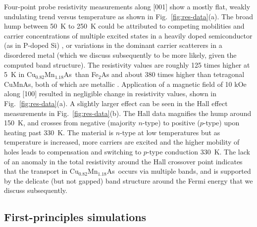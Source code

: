 \documentclass[letterpaper,10pt,doublespacing,edeposit]{uiucthesis2020}
\newcommand*{\cumnas}{Cu$_{0.82}$Mn$_{1.18}$As}
\begin{document}
\begin{mainmatter}
Four-point probe resistivity measurements along [001] show a mostly flat, weakly undulating trend versus temperature as shown in Fig.\ \ref{fig:res-data}(a).
The broad hump between 50~K to 250~K could be attributed to competing mobilities and carrier concentrations of multiple excited states in a heavily doped semiconductor (as in P-doped Si) \cite{Chapman1963}, or variations in the dominant carrier scatterers in a disordered metal (which we discuss subsequently to be more likely, given the computed band structure).
The resistivity values are roughly 125 times higher at 5~K in \cumnas\ than Fe$_2$As and about 380 times higher than tetragonal CuMnAs, both of which are metallic \cite{Takeshita2017,Wadley2013}.
Application of a magnetic field of 10 kOe along [100]  resulted in negligible change in resistivity values, shown in Fig.\ \ref{fig:res-data}(a).
A slightly larger effect can be seen in the Hall effect measurements in Fig.\ \ref{fig:res-data}(b).
The Hall data magnifies the hump around 150~K, and crosses from negative (majority $n$-type) to positive ($p$-type) upon heating past 330~K. 
The material is $n$-type at low temperatures but as temperature is increased, more carriers are excited and the higher mobility of holes leads to compensation and switching to $p$-type conduction 330~K.
The lack of an anomaly in the total resistivity around the Hall crossover point indicates that the transport in \cumnas\ occurs via multiple bands, and is supported by the delicate (but not gapped) band structure around the Fermi energy  that we discuss subsequently. 

\subsection{First-principles simulations}


\end{mainmatter}
\end{document}
